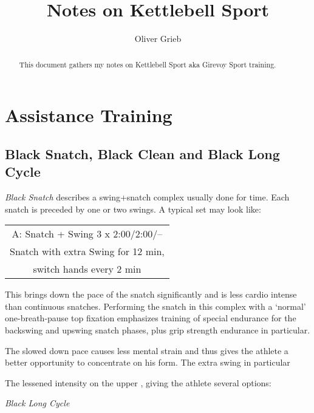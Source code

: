 \documentclass[a4paper,11pt,oneside]{article}
\author{Oliver Grieb}
\title{Notes on Kettlebell Sport}
\begin{document}
\maketitle

\begin{abstract}
This document gathers my notes on Kettlebell Sport aka Girevoy Sport training.
\end{abstract}

\section{Assistance Training}

\subsection{Black Snatch, Black Clean and Black Long Cycle}

\emph{Black Snatch} describes a swing+snatch complex usually done for time. Each
 snatch is preceded by one or two swings. A typical set may look like:

\begin{tabular}{c}
A: Snatch + Swing 3 x 2:00/2:00/-- \\
Snatch with extra Swing for 12 min, \\
switch hands every 2 min \\
\end{tabular}

This brings down the pace of the snatch significantly and is less cardio intense 
than continuous snatches. Performing the snatch in this complex with a `normal' 
one-breath-pause top fixation emphasizes training of special endurance for the 
backswing and upswing snatch phases, plus grip strength endurance in particular. 

The slowed down pace causes less mental strain and thus gives the athlete a better 
opportunity to concentrate on his form. The extra swing in particular

The lessened intensity on the upper 
, giving the athlete several options:


\emph{Black Long Cycle}
\end{document}
